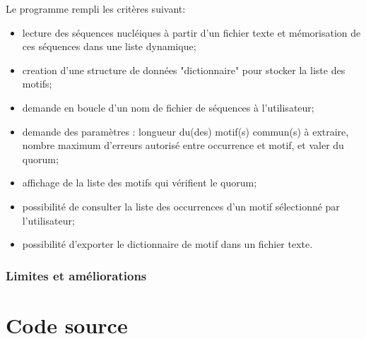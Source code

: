 \documentclass[11pt, oneside]{article}
\begin{document}
Le programme rempli les critères suivant:
\begin{itemize}
\item lecture des séquences nucléiques à partir d'un fichier texte et mémorisation de ces séquences dans une liste dynamique;
\item creation d'une structure de données "dictionnaire" pour stocker la liste des motifs;
\item demande en boucle d'un nom de fichier de séquences à l'utilisateur;
\item demande des paramètres : longueur du(des) motif(s) commun(s) à extraire, nombre maximum d'erreurs autorisé entre occurrence et motif, et valer du quorum;
\item affichage de la liste des motifs qui vérifient le quorum;
\item possibilité de consulter la liste des occurrences d'un motif sélectionné par l'utilisateur;
\item possibilité d'exporter le dictionnaire de motif dans un fichier texte.
\end{itemize}

\section{Limites et améliorations}  

\part*{Code source}





\end{document}
